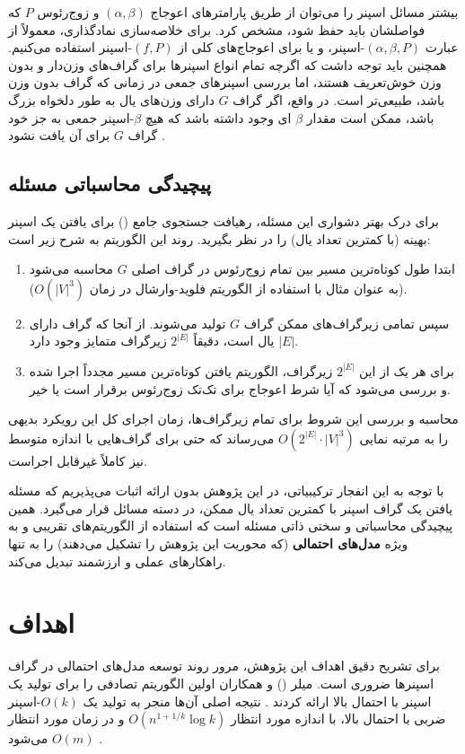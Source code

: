 \documentclass[12pt,a4paper]{article}
\begin{document}
بیشتر مسائل اسپنر را می‌توان از طریق پارامترهای اعوجاج $(\alpha, \beta)$ و زوج‌رئوس $P$ که فواصلشان باید حفظ شود، مشخص کرد. برای خلاصه‌سازی نمادگذاری، معمولاً از عبارت $(\alpha, \beta, P)$-اسپنر، و یا برای اعوجاج‌های کلی از $(f, P)$-اسپنر استفاده می‌کنیم. همچنین باید توجه داشت که اگرچه تمام انواع اسپنرها برای گراف‌های وزن‌دار و بدون وزن خوش‌تعریف هستند، اما بررسی اسپنرهای جمعی در زمانی که گراف بدون وزن باشد، طبیعی‌تر است. در واقع، اگر گراف $G$ دارای وزن‌های یال به طور دلخواه بزرگ باشد، ممکن است مقدار $\beta$ ای وجود داشته باشد که هیچ $\beta$-اسپنر جمعی به جز خود گراف $G$ برای آن یافت نشود \cite{survey}.

\subsection{پیچیدگی محاسباتی مسئله}
برای درک بهتر دشواری این مسئله، رهیافت جستجوی جامع () برای یافتن یک اسپنر بهینه (با کمترین تعداد یال) را در نظر بگیرید. روند این الگوریتم به شرح زیر است:
\begin{enumerate}
    \item ابتدا طول کوتاه‌ترین مسیر بین تمام زوج‌رئوس در گراف اصلی $G$ محاسبه می‌شود (به عنوان مثال با استفاده از الگوریتم فلوید-وارشال در زمان $O(|V|^3)$).
    \item سپس تمامی زیرگراف‌های ممکن گراف $G$ تولید می‌شوند. از آنجا که گراف دارای $|E|$ یال است، دقیقاً $2^{|E|}$ زیرگراف متمایز وجود دارد.
    \item برای هر یک از این $2^{|E|}$ زیرگراف، الگوریتم یافتن کوتاه‌ترین مسیر مجدداً اجرا شده و بررسی می‌شود که آیا شرط اعوجاج برای تک‌تک زوج‌رئوس برقرار است یا خیر.
\end{enumerate}
محاسبه و بررسی این شروط برای تمام زیرگراف‌ها، زمان اجرای کل این رویکرد بدیهی را به مرتبه نمایی $O(2^{|E|} \cdot |V|^3)$ می‌رساند که حتی برای گراف‌هایی با اندازه متوسط نیز کاملاً غیرقابل اجراست.

با توجه به این انفجار ترکیبیاتی، در این پژوهش بدون ارائه اثبات می‌پذیریم که مسئله یافتن یک گراف اسپنر با کمترین تعداد یال ممکن، در دسته مسائل \textbf{} قرار می‌گیرد. همین پیچیدگی محاسباتی و سختی ذاتی مسئله است که استفاده از الگوریتم‌های تقریبی و به ویژه \textbf{مدل‌های احتمالی} (که محوریت این پژوهش را تشکیل می‌دهند) را به تنها راهکارهای عملی و ارزشمند تبدیل می‌کند.

\newpage
\section{اهداف}
برای تشریح دقیق اهداف این پژوهش، مرور روند توسعه مدل‌های احتمالی در گراف اسپنرها ضروری است. میلر () و همکاران اولین الگوریتم تصادفی را برای تولید یک اسپنر با احتمال بالا ارائه کردند \cite{miller}. نتیجه اصلی آن‌ها منجر به تولید یک $O(k)$-اسپنر ضربی با احتمال بالا، با اندازه مورد انتظار $O(n^{1+1/k} \log k)$ و در زمان مورد انتظار $O(m)$ می‌شود \cite{miller}.
\end{document}
